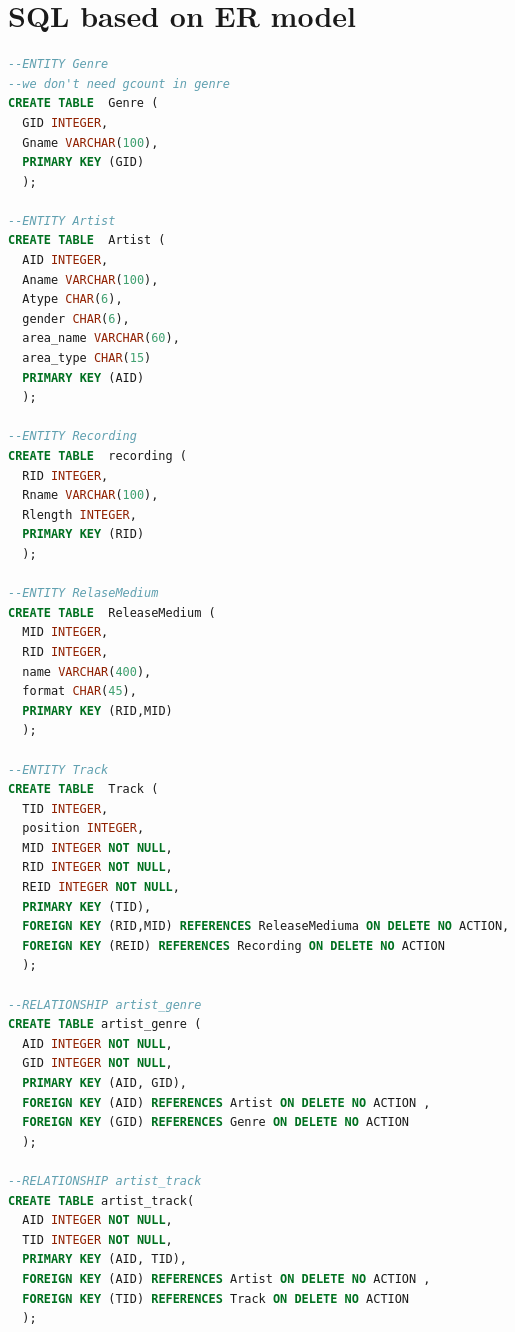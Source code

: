 \documentclass[11pt]{article} %
\begin{document}
\tiny{
\section{SQL based on ER model}
\begin{lstlisting}[language=SQL, keywordstyle=\color{blue!70},
commentstyle=\color{red!50!green!50!blue!50},
rulesepcolor=\color{red!20!green!20!blue!20},
frame=shadowbox]
--ENTITY Genre
--we don't need gcount in genre
CREATE TABLE  Genre (
  GID INTEGER,
  Gname VARCHAR(100),
  PRIMARY KEY (GID)
  );

--ENTITY Artist
CREATE TABLE  Artist (
  AID INTEGER,
  Aname VARCHAR(100),
  Atype CHAR(6),
  gender CHAR(6),
  area_name VARCHAR(60),
  area_type CHAR(15)
  PRIMARY KEY (AID)
  );
  
--ENTITY Recording
CREATE TABLE  recording (
  RID INTEGER,
  Rname VARCHAR(100),
  Rlength INTEGER,
  PRIMARY KEY (RID)
  );

--ENTITY RelaseMedium
CREATE TABLE  ReleaseMedium (
  MID INTEGER,
  RID INTEGER,
  name VARCHAR(400),
  format CHAR(45),
  PRIMARY KEY (RID,MID)
  );

--ENTITY Track
CREATE TABLE  Track (
  TID INTEGER,
  position INTEGER,
  MID INTEGER NOT NULL,
  RID INTEGER NOT NULL,
  REID INTEGER NOT NULL,
  PRIMARY KEY (TID),
  FOREIGN KEY (RID,MID) REFERENCES ReleaseMediuma ON DELETE NO ACTION,
  FOREIGN KEY (REID) REFERENCES Recording ON DELETE NO ACTION
  );
    
--RELATIONSHIP artist_genre
CREATE TABLE artist_genre (
  AID INTEGER NOT NULL,
  GID INTEGER NOT NULL,
  PRIMARY KEY (AID, GID),
  FOREIGN KEY (AID) REFERENCES Artist ON DELETE NO ACTION ,
  FOREIGN KEY (GID) REFERENCES Genre ON DELETE NO ACTION
  );
    
--RELATIONSHIP artist_track
CREATE TABLE artist_track(
  AID INTEGER NOT NULL,
  TID INTEGER NOT NULL,
  PRIMARY KEY (AID, TID),
  FOREIGN KEY (AID) REFERENCES Artist ON DELETE NO ACTION ,
  FOREIGN KEY (TID) REFERENCES Track ON DELETE NO ACTION 
  );
\end{lstlisting}}
\end{document}
